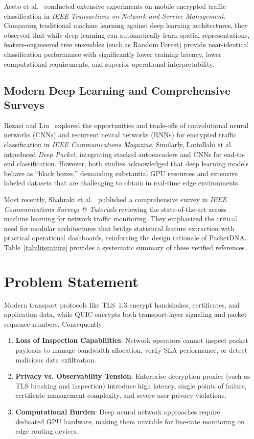 \documentclass[10pt,journal,compsoc]{IEEEtran}
\begin{document}
Aceto et al.~\cite{aceto2019mobile} conducted extensive experiments on mobile encrypted traffic classification in \textit{IEEE Transactions on Network and Service Management}. Comparing traditional machine learning against deep learning architectures, they observed that while deep learning can automatically learn spatial representations, feature-engineered tree ensembles (such as Random Forest) provide near-identical classification performance with significantly lower training latency, lower computational requirements, and superior operational interpretability.

\subsection{Modern Deep Learning and Comprehensive Surveys}
Rezaei and Liu~\cite{rezaei2019deep} explored the opportunities and trade-offs of convolutional neural networks (CNNs) and recurrent neural networks (RNNs) for encrypted traffic classification in \textit{IEEE Communications Magazine}. Similarly, Lotfollahi et al.~\cite{lotfollahi2020deep} introduced \textit{Deep Packet}, integrating stacked autoencoders and CNNs for end-to-end classification. However, both studies acknowledged that deep learning models behave as ``black boxes,'' demanding substantial GPU resources and extensive labeled datasets that are challenging to obtain in real-time edge environments.

Most recently, Shahraki et al.~\cite{shahraki2022survey} published a comprehensive survey in \textit{IEEE Communications Surveys \& Tutorials} reviewing the state-of-the-art across machine learning for network traffic monitoring. They emphasized the critical need for modular architectures that bridge statistical feature extraction with practical operational dashboards, reinforcing the design rationale of PacketDNA. Table~\ref{tab:literature} provides a systematic summary of these verified references.

\section{Problem Statement}
Modern transport protocols like TLS~1.3 encrypt handshakes, certificates, and application data, while QUIC encrypts both transport-layer signaling and packet sequence numbers. Consequently:
\begin{enumerate}
    \item \textbf{Loss of Inspection Capabilities}: Network operators cannot inspect packet payloads to manage bandwidth allocation, verify SLA performance, or detect malicious data exfiltration.
    \item \textbf{Privacy vs. Observability Tension}: Enterprise decryption proxies (such as TLS breaking and inspection) introduce high latency, single points of failure, certificate management complexity, and severe user privacy violations.
    \item \textbf{Computational Burden}: Deep neural network approaches require dedicated GPU hardware, making them unviable for line-rate monitoring on edge routing devices.
\end{enumerate}
\end{document}
